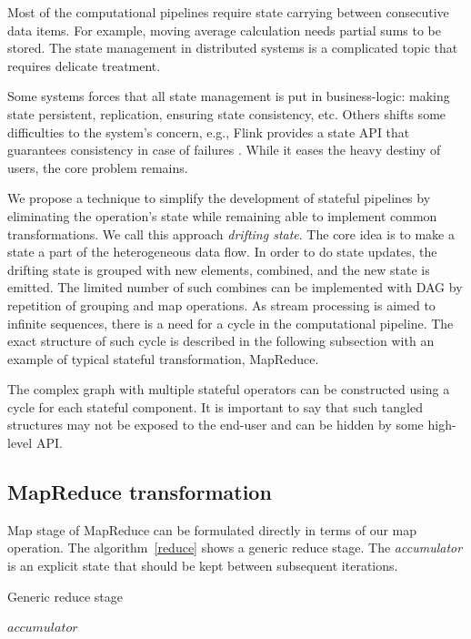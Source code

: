 
\label{fs-drifting}

Most of the computational pipelines require state carrying between consecutive data items. For example, moving average calculation needs partial sums to be stored. The state management in distributed systems is a complicated topic that requires delicate treatment.

Some systems forces that all state management is put in business-logic: making state persistent, replication, ensuring state consistency, etc. Others shifts some difficulties to the system's concern, e.g., Flink provides a state API that guarantees consistency in case of failures \cite{Carbone:2017:SMA:3137765.3137777}. While it eases the heavy destiny of users, the core problem remains.

We propose a technique to simplify the development of stateful pipelines by eliminating the operation's state while remaining able to implement common transformations. We call this approach {\it drifting state}. The core idea is to make a state a part of the heterogeneous data flow. In order to do state updates, the drifting state is grouped with new elements, combined, and the new state is emitted. The limited number of such combines can be implemented with DAG by repetition of grouping and map operations. As stream processing is aimed to infinite sequences, there is a need for a cycle in the computational pipeline. The exact structure of such cycle is described in the following subsection with an example of typical stateful transformation, MapReduce.

The complex graph with multiple stateful operators can be constructed using a cycle for each stateful component. It is important to say that such tangled structures may not be exposed to the end-user and can be hidden by some high-level API.

\subsection{MapReduce transformation}
Map stage of MapReduce can be formulated directly in terms of our map operation. The algorithm~\ref{reduce} shows a generic reduce stage. The {\it accumulator} is an explicit state that should be kept between subsequent iterations.

\begin{algorithm}
\caption{Generic reduce stage}
\label{reduce}
\begin{algorithmic}
    \State $accumulator$ 
      \State {}
    \EndFor
    \State \Return {}
  \EndFunction
\end{algorithmic}
\end{algorithm}

